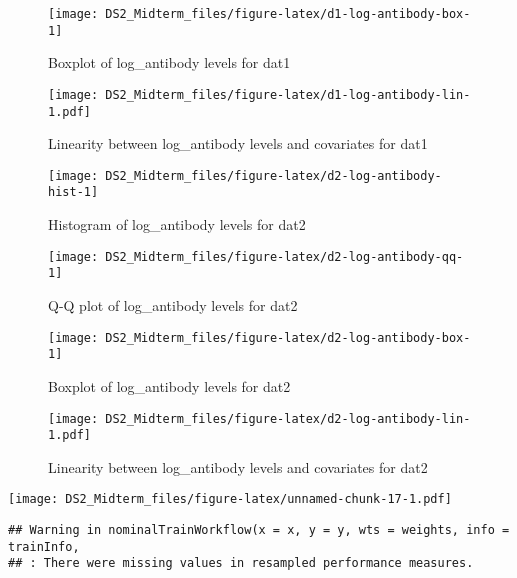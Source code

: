 \documentclass[
]{article}
\begin{document}
\begin{figure}

{\centering \texttt{[image: DS2\_Midterm\_files/figure-latex/d1-log-antibody-box-1]} 

}

\caption{Boxplot of log\_antibody levels for dat1}\label{fig:d1-log-antibody-box}
\end{figure}

\begin{figure}
\centering
\texttt{[image: DS2\_Midterm\_files/figure-latex/d1-log-antibody-lin-1.pdf]}
\caption{Linearity between log\_antibody levels and covariates for dat1}
\end{figure}

\begin{figure}

{\centering \texttt{[image: DS2\_Midterm\_files/figure-latex/d2-log-antibody-hist-1]} 

}

\caption{Histogram of log\_antibody levels for dat2}\label{fig:d2-log-antibody-hist}
\end{figure}

\begin{figure}

{\centering \texttt{[image: DS2\_Midterm\_files/figure-latex/d2-log-antibody-qq-1]} 

}

\caption{Q-Q plot of log\_antibody levels for dat2}\label{fig:d2-log-antibody-qq}
\end{figure}

\begin{figure}

{\centering \texttt{[image: DS2\_Midterm\_files/figure-latex/d2-log-antibody-box-1]} 

}

\caption{Boxplot of log\_antibody levels for dat2}\label{fig:d2-log-antibody-box}
\end{figure}

\begin{figure}
\centering
\texttt{[image: DS2\_Midterm\_files/figure-latex/d2-log-antibody-lin-1.pdf]}
\caption{Linearity between log\_antibody levels and covariates for dat2}
\end{figure}

\texttt{[image: DS2\_Midterm\_files/figure-latex/unnamed-chunk-17-1.pdf]}

\begin{verbatim}
## Warning in nominalTrainWorkflow(x = x, y = y, wts = weights, info = trainInfo,
## : There were missing values in resampled performance measures.
\end{verbatim}
\end{document}
